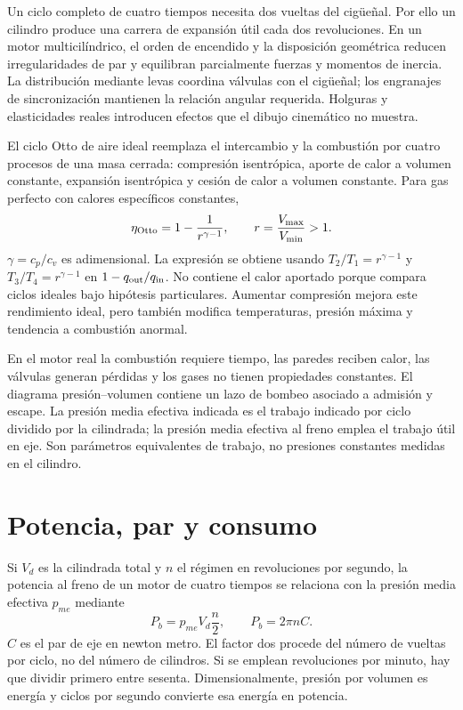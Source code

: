 Un ciclo completo de cuatro tiempos necesita dos vueltas del cigüeñal. Por ello un cilindro produce una carrera de expansión útil cada dos revoluciones. En un motor multicilíndrico, el orden de encendido y la disposición geométrica reducen irregularidades de par y equilibran parcialmente fuerzas y momentos de inercia. La distribución mediante levas coordina válvulas con el cigüeñal; los engranajes de sincronización mantienen la relación angular requerida. Holguras y elasticidades reales introducen efectos que el dibujo cinemático no muestra.

El ciclo Otto de aire ideal reemplaza el intercambio y la combustión por cuatro procesos de una masa cerrada: compresión isentrópica, aporte de calor a volumen constante, expansión isentrópica y cesión de calor a volumen constante. Para gas perfecto con calores específicos constantes,
\begin{equation}
 \eta_{\rm Otto}=1-\frac{1}{r^{\gamma-1}},\qquad r=\frac{V_{\max}}{V_{\min}}>1.
\end{equation}
$\gamma=c_p/c_v$ es adimensional. La expresión se obtiene usando $T_2/T_1=r^{\gamma-1}$ y $T_3/T_4=r^{\gamma-1}$ en $1-q_{\rm out}/q_{\rm in}$. No contiene el calor aportado porque compara ciclos ideales bajo hipótesis particulares. Aumentar compresión mejora este rendimiento ideal, pero también modifica temperaturas, presión máxima y tendencia a combustión anormal.

En el motor real la combustión requiere tiempo, las paredes reciben calor, las válvulas generan pérdidas y los gases no tienen propiedades constantes. El diagrama presión--volumen contiene un lazo de bombeo asociado a admisión y escape. La presión media efectiva indicada es el trabajo indicado por ciclo dividido por la cilindrada; la presión media efectiva al freno emplea el trabajo útil en eje. Son parámetros equivalentes de trabajo, no presiones constantes medidas en el cilindro.

\section{Potencia, par y consumo}
Si $V_d$ es la cilindrada total y $n$ el régimen en revoluciones por segundo, la potencia al freno de un motor de cuatro tiempos se relaciona con la presión media efectiva $p_{me}$ mediante
\begin{equation}
 P_b=p_{me}V_d\frac{n}{2},\qquad P_b=2\pi n C.
\end{equation}
$C$ es el par de eje en newton metro. El factor dos procede del número de vueltas por ciclo, no del número de cilindros. Si se emplean revoluciones por minuto, hay que dividir primero entre sesenta. Dimensionalmente, presión por volumen es energía y ciclos por segundo convierte esa energía en potencia.

